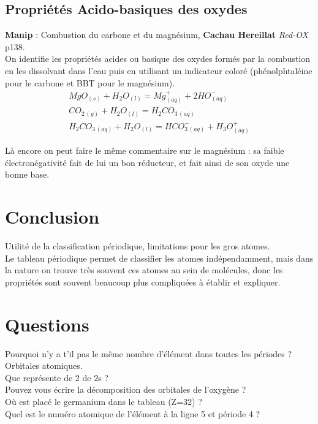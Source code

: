 \documentclass[12pt,prb,aps,epsf]{article}
\begin{document}
\subsection{Propriétés Acido-basiques des oxydes}
\textbf{Manip} : Combustion du carbone et du magnésium,
\textbf{Cachau Hereillat} \textit{Red-OX} p138.\\
On identifie les propriétés acides ou basique des oxydes formés par la combustion en les dissolvant dans l'eau puis en utilisant un indicateur coloré (phénolphtaléine pour le carbone et BBT pour le magnésium).
\begin{eqnarray}
MgO_{(s)} + H_2O_{(l)} = Mg^+_{(aq)} + 2HO^-_{(aq)}\\
CO_{2\,(g)} + H_2O_{(l)} = H_2CO_{3\,(aq)}\\
H_2CO_{3\,(aq)} + H_2O_{(l)} = HCO_{3\,(aq)}^- + H_3O^+_{(aq)} 
\end{eqnarray}

Là encore on peut faire le même commentaire sur le magnésium : sa faible électronégativité fait de lui un bon réducteur, et fait ainsi de son oxyde une bonne base.

\section{Conclusion}
Utilité de la classification périodique, limitations pour les gros atomes. \\
Le tableau périodique permet de classifier les atomes indépendamment, mais dans la nature on trouve très souvent ces atomes au sein de molécules, donc les propriétés sont souvent beaucoup plus compliquées à établir et expliquer.

\section*{Questions}
Pourquoi n'y a t'il pas le même nombre d'élément dans toutes les périodes ?\\
Orbitales atomiques.\\

Que représente de 2 de 2s ?\\
Pouvez vous écrire la décomposition des orbitales de l'oxygène ?\\

Où est placé le germanium dans le tableau (Z=32) ?\\

Quel est le numéro atomique de l'élément à la ligne 5 et période 4 ?\\
\end{document}
